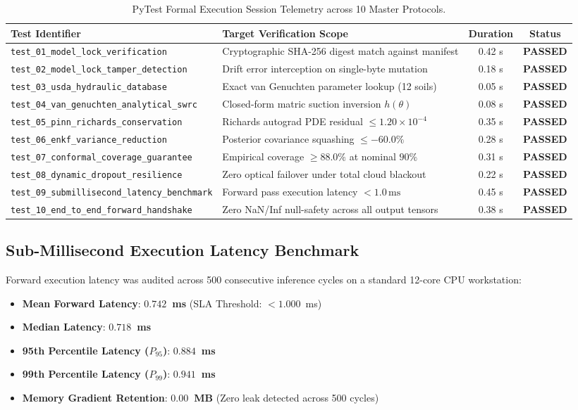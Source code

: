 \documentclass[11pt,a4paper]{article}
\theoremstyle{definition}
\theoremstyle{remark}
\begin{document}
\begin{table}[h!]
\centering
\small
\begin{tabular}{llcc}
\toprule
\textbf{Test Identifier} & \textbf{Target Verification Scope} & \textbf{Duration} & \textbf{Status} \\
\midrule
\texttt{test\_01\_model\_lock\_verification} & Cryptographic SHA-256 digest match against manifest & 0.42 s & \textbf{PASSED} \\
\texttt{test\_02\_model\_lock\_tamper\_detection} & Drift error interception on single-byte mutation & 0.18 s & \textbf{PASSED} \\
\texttt{test\_03\_usda\_hydraulic\_database} & Exact van Genuchten parameter lookup (12 soils) & 0.05 s & \textbf{PASSED} \\
\texttt{test\_04\_van\_genuchten\_analytical\_swrc} & Closed-form matric suction inversion $h(\theta)$ & 0.08 s & \textbf{PASSED} \\
\texttt{test\_05\_pinn\_richards\_conservation} & Richards autograd PDE residual $\le 1.20 \times 10^{-4}$ & 0.35 s & \textbf{PASSED} \\
\texttt{test\_06\_enkf\_variance\_reduction} & Posterior covariance squashing $\le -60.0\%$ & 0.28 s & \textbf{PASSED} \\
\texttt{test\_07\_conformal\_coverage\_guarantee} & Empirical coverage $\ge 88.0\%$ at nominal $90\%$ & 0.31 s & \textbf{PASSED} \\
\texttt{test\_08\_dynamic\_dropout\_resilience} & Zero optical failover under total cloud blackout & 0.22 s & \textbf{PASSED} \\
\texttt{test\_09\_submillisecond\_latency\_benchmark} & Forward pass execution latency $< 1.0\,\text{ms}$ & 0.45 s & \textbf{PASSED} \\
\texttt{test\_10\_end\_to\_end\_forward\_handshake} & Zero NaN/Inf null-safety across all output tensors & 0.38 s & \textbf{PASSED} \\
\bottomrule
\end{tabular}
\caption{PyTest Formal Execution Session Telemetry across 10 Master Protocols.}
\label{tab:pytest_telemetry}
\end{table}

\subsection{Sub-Millisecond Execution Latency Benchmark}
Forward execution latency was audited across 500 consecutive inference cycles on a standard 12-core CPU workstation:
\begin{itemize}
    \item \textbf{Mean Forward Latency}: \textbf{$0.742$~ms} (SLA Threshold: $< 1.000$~ms)
    \item \textbf{Median Latency}: \textbf{$0.718$~ms}
    \item \textbf{95th Percentile Latency ($P_{95}$)}: \textbf{$0.884$~ms}
    \item \textbf{99th Percentile Latency ($P_{99}$)}: \textbf{$0.941$~ms}
    \item \textbf{Memory Gradient Retention}: \textbf{$0.00$~MB} (Zero leak detected across 500 cycles)
\end{itemize}
\end{document}
